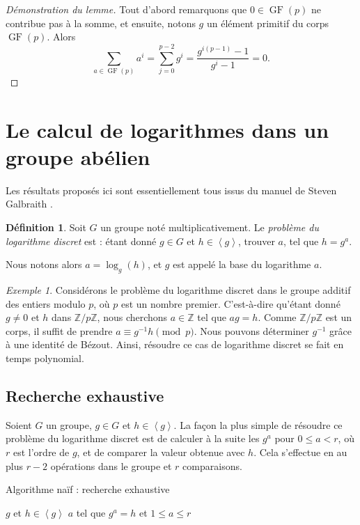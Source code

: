 \documentclass[a4paper, titlepage]{article}
\theoremstyle{definition}
\newtheorem{defi}[theo]{Définition}
\theoremstyle{remark}
\newtheorem{exem}[theo]{Exemple}
\def\Z{\mathbb Z}
\def\gf{\operatorname{GF}}
\def\gen #1{\left\langle#1\right\rangle}
\begin{document}
\begin{proof}[Démonstration du lemme]
Tout d'abord remarquons que $0 \in \gf(p)$ ne contribue pas à la somme, et ensuite, notons $g$ un élément primitif du corps $\gf(p)$. Alors
$$\sum_{a\in\gf(p)} a^i = \sum_{j=0}^{p-2} g^i = \frac{g^{i(p-1)} - 1}{g^{i} - 1} = 0.$$
\end{proof}

\section{Le calcul de logarithmes dans un groupe abélien}\label{logDiscret}

Les résultats proposés ici sont essentiellement tous issus du manuel de Steven Galbraith \cite[section 13 et 14, pp. 246 à 297]{galbraith2012}.

\begin{defi}\label{defLogDiscret}
Soit $G$ un groupe noté multiplicativement. Le \textit{problème du logarithme discret} est : étant donné $g\in G$ et $h \in \gen{g}$, trouver $a$, tel que $h=g^a$.\end{defi}
Nous notons alors $a=\log_g(h)$, et $g$ est appelé la base du logarithme $a$.


\begin{exem}
Considérons le problème du logarithme discret dans le groupe additif des entiers modulo $p$, où $p$ est un nombre premier. C'est-à-dire qu'étant donné $g \neq 0$ et $h$ dans $\Z/p\Z$, nous cherchons $a \in \Z$ tel que $ag = h$. Comme $\Z/p\Z$ est un corps, il suffit de prendre $a \equiv g^{-1}h \pmod{p}$. Nous pouvons déterminer $g^{-1}$ grâce à une identité de Bézout. Ainsi, résoudre ce cas de logarithme discret se fait en temps polynomial.
\end{exem}

\subsection{Recherche exhaustive}

Soient $G$ un groupe, $g\in G$ et $h \in \gen{g}$. La façon la plus simple de résoudre ce problème du logarithme discret est de calculer à la suite les $g^a$ pour $0 \leqslant a < r$, où $r$ est l'ordre de $g$, et de comparer la valeur obtenue avec $h$. Cela s'effectue en au plus $r - 2$ opérations dans le groupe et $r$ comparaisons.

\begin{algorithm}[h]
\caption{Algorithme naïf : recherche exhaustive}
\label{algoLogDiscretNaif}
\begin{algorithmic}[1]
\REQUIRE $g$ et $h \in \gen{g}$
\ENSURE $a$ tel que $g^a = h$ et $1 \leqslant a \leqslant r$
\ENDWHILE
{}
\end{algorithmic}
\end{algorithm}
\end{document}
